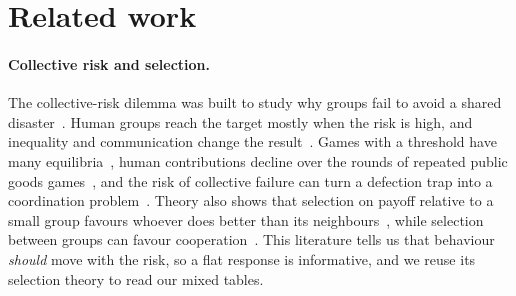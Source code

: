 \section{Related work}
\label{sec:related}

\paragraph{Collective risk and selection.}
The collective-risk dilemma was built to study why groups fail to avoid a shared
disaster~\cite{milinski2008collective}. Human groups reach the target mostly when the risk
is high, and inequality and communication change the result~\cite{tavoni2011inequality}.
Games with a threshold have many equilibria~\cite{palfrey1984participation}, human
contributions decline over the rounds of repeated public goods games~\cite{andreoni1988free},
and the risk of collective failure can turn a defection trap into a coordination
problem~\cite{santos2011risk}. Theory also shows that selection on payoff relative to a small
group favours whoever does better than its neighbours~\cite{schaffer1988evolutionarily},
while selection between groups can favour cooperation~\cite{traulsen2006evolution}. This
literature tells us that behaviour \emph{should} move with the risk, so a flat response is
informative, and we reuse its selection theory to read our mixed tables.

